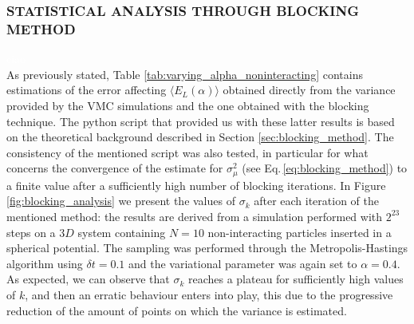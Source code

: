\subsubsection{STATISTICAL ANALYSIS THROUGH BLOCKING METHOD}
\textcolor{white}{ciao\\}
As previously stated, Table \ref{tab:varying_alpha_noninteracting} contains estimations of the error affecting $\langle E_L(\alpha) \rangle$ obtained directly from the variance provided by the VMC simulations and the one obtained with the blocking technique. The python script that provided us with these latter results is based on the theoretical background described in Section \ref{sec:blocking_method}. The consistency of the mentioned script was also tested, in particular for what concerns the convergence of the estimate for  $\sigma_\mu^2$ (see Eq.\,\ref{eq:blocking_method}) to a finite value after a sufficiently high number of blocking iterations. In Figure \ref{fig:blocking_analysis} we present the values of $\sigma_k$ after each iteration of the mentioned method: the results are derived from a simulation performed with $2^{23}$ steps on a $3D$ system containing $N=10$ non-interacting particles inserted in a spherical potential. The sampling was performed through the Metropolis-Hastings algorithm using $\delta t=0.1$ and the variational parameter was again set to $\alpha=0.4$. As expected, we can observe that $\sigma_k$ reaches a plateau for sufficiently high values of $k$, and then an erratic behaviour enters into play, this due to the progressive reduction of the amount of points on which the variance is estimated. 



